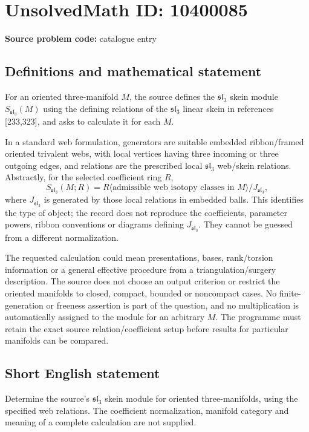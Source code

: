 \documentclass[11pt]{article}
\begin{document}
\section*{UnsolvedMath ID: 10400085}
\textbf{Source problem code:} catalogue entry
\subsection{Definitions and mathematical statement}
For an oriented three-manifold $M$, the source defines the $\mathfrak{sl}_3$ skein module $S_{\mathfrak{sl}_3}(M)$ using the defining relations of the $\mathfrak{sl}_3$ linear skein in references [233,323], and asks to calculate it for each $M$.

In a standard web formulation, generators are suitable embedded ribbon/framed oriented trivalent webs, with local vertices having three incoming or three outgoing edges, and relations are the prescribed local $\mathfrak{sl}_3$ web/skein relations. Abstractly, for the selected coefficient ring $R$,
\[
S_{\mathfrak{sl}_3}(M;R)=R\langle\text{admissible web isotopy classes in }M\rangle/J_{\mathfrak{sl}_3},
\]
where $J_{\mathfrak{sl}_3}$ is generated by those local relations in embedded balls. This identifies the type of object; the record does not reproduce the coefficients, parameter powers, ribbon conventions or diagrams defining $J_{\mathfrak{sl}_3}$. They cannot be guessed from a different normalization.

The requested calculation could mean presentations, bases, rank/torsion information or a general effective procedure from a triangulation/surgery description. The source does not choose an output criterion or restrict the oriented manifolds to closed, compact, bounded or noncompact cases. No finite-generation or freeness assertion is part of the question, and no multiplication is automatically assigned to the module for an arbitrary $M$. The programme must retain the exact source relation/coefficient setup before results for particular manifolds can be compared.
\subsection{Short English statement}
Determine the source's $\mathfrak{sl}_3$ skein module for oriented three-manifolds, using the specified web relations. The coefficient normalization, manifold category and meaning of a complete calculation are not supplied.
\end{document}
